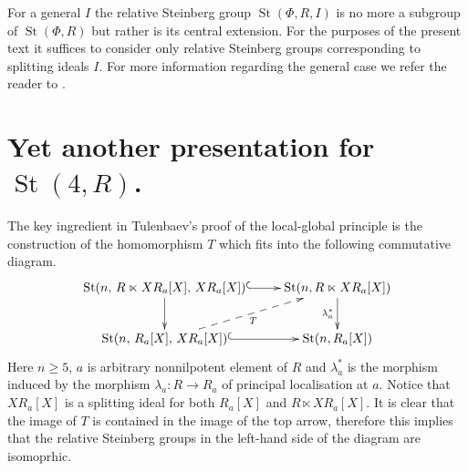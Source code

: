 \documentclass[11pt]{amsart}
\theoremstyle{plain} \declaretheorem[name=Theorem, Refname={Theorem,Theorems}]{tm} \Crefname{tm}{Theorem}{Theorems}
\numberwithin{equation}{section}
\theoremstyle{definition} \newtheorem{df}[lm]{Definition} \Crefname{df}{Definition}{Definitions}
\theoremstyle{remark} \newtheorem{rk}[lm]{Remark} \Crefname{rk}{Remark}{Remarks}
\newcommand{\St}{\mathop{\mathrm{St}}\nolimits}
\begin{document}
For a general $I$ the relative Steinberg group $\St(\Phi, R, I)$ is no more a subgroup of $\St(\Phi, R)$ but rather is its central extension.
For the purposes of the present text it suffices to consider only relative Steinberg groups corresponding to splitting ideals $I$.
For more information regarding the general case we refer the reader to \cite[Section~3]{SCh}.

\section{Yet another presentation for $\St(4, R)$.} \label{sec:yap}
The key ingredient in Tulenbaev's proof of the local-global principle is the construction of the homomorphism $T$ which fits into the following commutative diagram.
$$\xymatrix{\St(n,\,R\ltimes XR_a[X],\,XR_a[X]) \ar@{^{(}->}[r] \ar[d] & \St(n, R \ltimes XR_a[X]) \ar[d]_-{\lambda_a^*} \\
             \St(n,\,R_a[X],\,XR_a[X]) \ar@{-->}[ru]_-{T} \ar@{^{(}->}[r] & \St(n, R_a[X])}$$
Here $n\geq5$, $a$ is arbitrary nonnilpotent element of $R$ and $\lambda_a^*$ is the morphism induced by the morphism $\lambda_a\colon R \to R_a$ of principal localisation at $a$.
Notice that $XR_a[X]$ is a splitting ideal for both $R_a[X]$ and $R \ltimes XR_a[X]$.
It is clear that the image of $T$ is contained in the image of the top arrow, therefore this implies that the relative Steinberg groups in the left-hand side of the diagram are isomoprhic.

\end{document}
